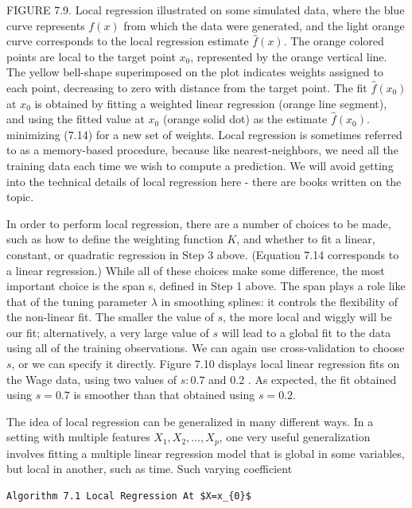 \documentclass[10pt]{article}
\begin{document}
FIGURE 7.9. Local regression illustrated on some simulated data, where the blue curve represents $f(x)$ from which the data were generated, and the light orange curve corresponds to the local regression estimate $\hat{f}(x)$. The orange colored points are local to the target point $x_{0}$, represented by the orange vertical line. The yellow bell-shape superimposed on the plot indicates weights assigned to each point, decreasing to zero with distance from the target point. The fit $\hat{f}\left(x_{0}\right)$ at $x_{0}$ is obtained by fitting a weighted linear regression (orange line segment), and using the fitted value at $x_{0}$ (orange solid dot) as the estimate $\hat{f}\left(x_{0}\right)$.\\
minimizing (7.14) for a new set of weights. Local regression is sometimes referred to as a memory-based procedure, because like nearest-neighbors, we need all the training data each time we wish to compute a prediction. We will avoid getting into the technical details of local regression here - there are books written on the topic.

In order to perform local regression, there are a number of choices to be made, such as how to define the weighting function $K$, and whether to fit a linear, constant, or quadratic regression in Step 3 above. (Equation 7.14 corresponds to a linear regression.) While all of these choices make some difference, the most important choice is the span s, defined in Step 1 above. The span plays a role like that of the tuning parameter $\lambda$ in smoothing splines: it controls the flexibility of the non-linear fit. The smaller the value of $s$, the more local and wiggly will be our fit; alternatively, a very large value of $s$ will lead to a global fit to the data using all of the training observations. We can again use cross-validation to choose $s$, or we can specify it directly. Figure 7.10 displays local linear regression fits on the Wage data, using two values of $s: 0.7$ and 0.2 . As expected, the fit obtained using $s=0.7$ is smoother than that obtained using $s=0.2$.

The idea of local regression can be generalized in many different ways. In a setting with multiple features $X_{1}, X_{2}, \ldots, X_{p}$, one very useful generalization involves fitting a multiple linear regression model that is global in some variables, but local in another, such as time. Such varying coefficient

\begin{verbatim}
Algorithm 7.1 Local Regression At $X=x_{0}$
\end{verbatim}
\end{document}
